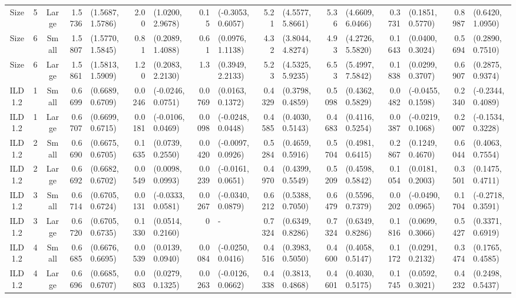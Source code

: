 \begin{landscape}
\begin{table}[!ht]
\begin{tabular}{cccrlrlrlrlrlrlrl}
Size	&	5	&	Large	&	1.5736	&	(1.5687, 1.5786)	&	2.00	&	(1.0200, 2.9678)	&	0.15	&	(-0.3053, 0.6057)	&	5.21	&	(4.5577, 5.8661)	&	5.36	&	(4.6609, 6.0466)	&	0.3731	&	(0.1851, 0.5770)	&	0.8987	&	(0.6420, 1.0950)	\\
Size	&	6	&	Small	&	1.5807	&	(1.5770, 1.5845)	&	0.81	&	(0.2089, 1.4088)	&	0.61	&	(0.0976, 1.1138)	&	4.32	&	(3.8044, 4.8274)	&	4.93	&	(4.2726, 5.5820)	&	0.1643	&	(0.0400, 0.3024)	&	0.5694	&	(0.2890, 0.7510)	\\
Size	&	6	&	Large	&	1.5861	&	(1.5813, 1.5909)	&	1.20	&	(0.2083, 2.2130)	&	1.3	&	(0.3949, 2.2133)	&	5.23	&	(4.5325, 5.9235)	&	6.53	&	(5.4997, 7.5842)	&	0.1838	&	(0.0299, 0.3707)	&	0.6907	&	(0.2875, 0.9374)	\\
ILD1.2	&	1	&	Small	&	0.6699	&	(0.6689, 0.6709)	&	0.0246	&	(-0.0246, 0.0751)	&	0.0769	&	(0.0163, 0.1372)	&	0.4329	&	(0.3798, 0.4859)	&	0.5098	&	(0.4362, 0.5829)	&	0.0482	&	(-0.0455, 0.1598)	&	0.2340	&	(-0.2344, 0.4089)	\\
ILD1.2	&	1	&	Large	&	0.6707	&	(0.6699, 0.6715)	&	0.0181	&	(-0.0106, 0.0469)	&	0.0098	&	(-0.0248, 0.0448)	&	0.4585	&	(0.4030, 0.5143)	&	0.4683	&	(0.4116, 0.5254)	&	0.0387	&	(-0.0219, 0.1068)	&	0.2007	&	(-0.1534, 0.3228)	\\
ILD1.2	&	2	&	Small	&	0.6690	&	(0.6675, 0.6705)	&	0.1635	&	(0.0739, 0.2550)	&	0.0420	&	(-0.0097, 0.0926)	&	0.5284	&	(0.4659, 0.5916)	&	0.5704	&	(0.4981, 0.6415)	&	0.2867	&	(0.1249, 0.4670)	&	0.6044	&	(0.4063, 0.7554)	\\
ILD1.2	&	2	&	Large	&	0.6692	&	(0.6682, 0.6702)	&	0.0549	&	(0.0098, 0.0993)	&	0.0239	&	(-0.0161, 0.0651)	&	0.4970	&	(0.4399, 0.5549)	&	0.5209	&	(0.4598, 0.5842)	&	0.1054	&	(0.0181, 0.2003)	&	0.3501	&	(0.1475, 0.4711)	\\
ILD1.2	&	3	&	Small	&	0.6714	&	(0.6705, 0.6724)	&	0.0131	&	(-0.0333, 0.0581)	&	0.0267	&	(-0.0340, 0.0879)	&	0.6212	&	(0.5388, 0.7050)	&	0.6479	&	(0.5596, 0.7379)	&	0.0202	&	(-0.0490, 0.0965)	&	0.1704	&	(-0.2718, 0.3591)	\\
ILD1.2	&	3	&	Large	&	0.6720	&	(0.6705, 0.6735)	&	0.1330	&	(0.0514, 0.2160)	&	0	&	-	&	0.7324	&	(0.6349, 0.8286)	&	0.7324	&	(0.6349, 0.8286)	&	0.1816	&	(0.0699, 0.3066)	&	0.5427	&	(0.3371, 0.6919)	\\
ILD1.2	&	4	&	Small	&	0.6685	&	(0.6676, 0.6695)	&	0.0539	&	(0.0139, 0.0940)	&	0.0084	&	(-0.0250, 0.0416)	&	0.4516	&	(0.3983, 0.5050)	&	0.4600	&	(0.4058, 0.5147)	&	0.1172	&	(0.0291, 0.2132)	&	0.3474	&	(0.1765, 0.4585)	\\
ILD1.2	&	4	&	Large	&	0.6696	&	(0.6685, 0.6707)	&	0.0803	&	(0.0279, 0.1325)	&	0.0263	&	(-0.0126, 0.0662)	&	0.4338	&	(0.3813, 0.4868)	&	0.4601	&	(0.4030, 0.5175)	&	0.1745	&	(0.0592, 0.3021)	&	0.4232	&	(0.2498, 0.5437)	\\

\end{tabular}
\end{table}
\end{landscape}
